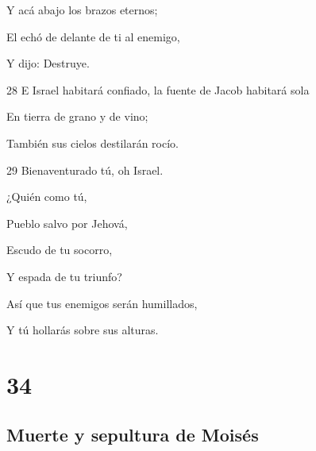 \par Y acá abajo los brazos eternos;
\par El echó de delante de ti al enemigo, 
\par Y dijo: Destruye.
\par 28 E Israel habitará confiado, la fuente de Jacob habitará sola
\par En tierra de grano y de vino;
\par También sus cielos destilarán rocío.
\par 29 Bienaventurado tú, oh Israel.
\par ¿Quién como tú,
\par Pueblo salvo por Jehová,
\par Escudo de tu socorro,
\par Y espada de tu triunfo?
\par Así que tus enemigos serán humillados,
\par Y tú hollarás sobre sus alturas.

\chapter{34}

\section{Muerte y sepultura de Moisés}

